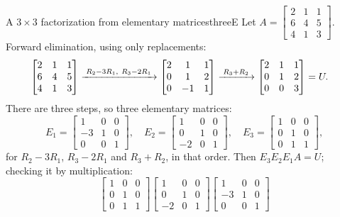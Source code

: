 \documentclass[11pt]{article}
\begin{document}
\begin{exmp}{A $3\times3$ factorization from elementary matrices}{threeE}
Let $A=\begin{bmatrix}2&1&1\\6&4&5\\4&1&3\end{bmatrix}$. Forward elimination, using only replacements:
\begin{align*}
\begin{bmatrix}2&1&1\\6&4&5\\4&1&3\end{bmatrix}
&\xrightarrow{\;R_2-3R_1,\ R_3-2R_1\;}
\begin{bmatrix}2&1&1\\0&1&2\\0&-1&1\end{bmatrix}
\xrightarrow{\;R_3+R_2\;}
\begin{bmatrix}2&1&1\\0&1&2\\0&0&3\end{bmatrix}=U .
\end{align*}
There are three steps, so three elementary matrices:
\[
E_1=\begin{bmatrix}1&0&0\\-3&1&0\\0&0&1\end{bmatrix},\quad
E_2=\begin{bmatrix}1&0&0\\0&1&0\\-2&0&1\end{bmatrix},\quad
E_3=\begin{bmatrix}1&0&0\\0&1&0\\0&1&1\end{bmatrix},
\]
for $R_2-3R_1$, $R_3-2R_1$ and $R_3+R_2$, in that order. Then $E_3E_2E_1A=U$; checking it by multiplication:
\[
\begin{bmatrix}1&0&0\\0&1&0\\0&1&1\end{bmatrix}
\begin{bmatrix}1&0&0\\0&1&0\\-2&0&1\end{bmatrix}
\begin{bmatrix}1&0&0\\-3&1&0\\0&0&1\end{bmatrix}
\]
\end{exmp}
\end{document}
